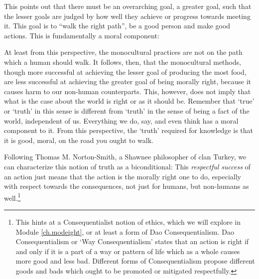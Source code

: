 This points out that there must be an overarching goal, a greater goal, such that the lesser goals are judged by how well they achieve or progress towards meeting it. This goal is to ``walk the right path'', be a good person and make good actions. This is fundamentally a moral component:

At least from this perspective, the monocultural practices are not on the path which a human should walk. It follows, then, that the monocultural methods, though more successful at achieving the lesser goal of producing the most food, are less successful at achieving the greater goal of being morally right, because it causes harm to our non-human counterparts. This, however, does not imply that what is the case about the world is right or as it should be. Remember that `true' or `truth' in this sense is different from `truth' in the sense of being a fact of the world, independent of us. Everything we do, say, and even think has a moral component to it. From this perspective, the `truth' required for knowledge is that it is good, moral, on the road you ought to walk. 

Following Thomas M. Norton-Smith, a Shawnee philosopher of clan Turkey, we can characterize this notion of truth as a biconditional:
This \emph{respectful success} of an action just means that the action is the morally right one to do, especially with respect towards the consequences, not just for humans, but non-humans as well.\footnote{This hints at a Consequentialist notion of ethics, which we will explore in Module \ref{ch.modeight}, or at least a form of Dao Consequentialism. Dao Consequentialism or `Way Consequentialism' states that an action is right if and only if it is a part of a way or pattern of life which as a whole causes more good and less bad. Different forms of Consequentialism propose different goods and bads which ought to be promoted or mitigated respectfully.}  

